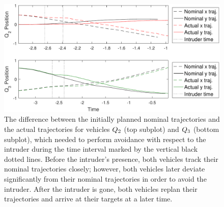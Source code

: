 \begin{figure}
  \centering
  \includegraphics[width=\columnwidth]{"fig/intruder1_diff"}
  \caption{The difference between the initially planned nominal trajectories and the actual trajectories for vehicles $Q_2$ (top subplot) and $Q_3$ (bottom subplot), which needed to perform avoidance with respect to the intruder during the time interval marked by the vertical black dotted lines. Before the intruder's presence, both vehicles track their nominal trajectories closely; however, both vehicles later deviate significantly from their nominal trajectories in order to avoid the intruder. After the intruder is gone, both vehicles replan their trajectories and arrive at their targets at a later time.}
  \label{fig:intruder1_diff}
\end{figure}